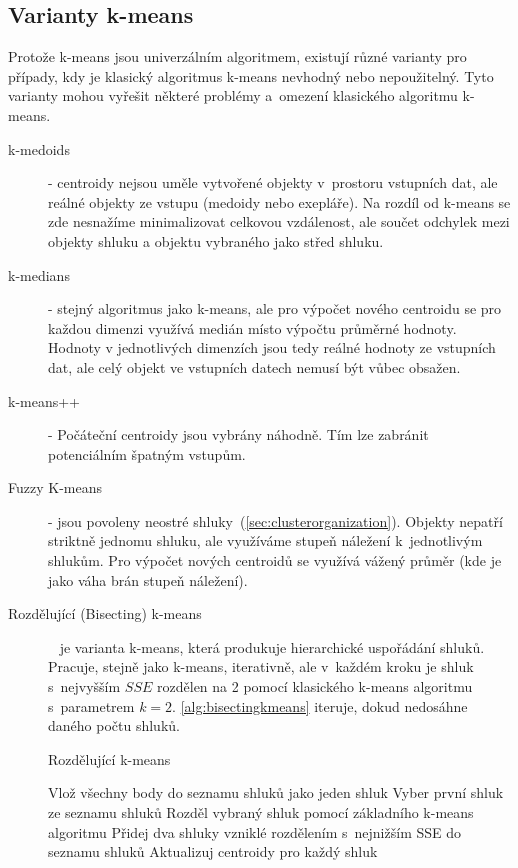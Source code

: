 \subsection{Varianty k-means}
Protože k-means jsou univerzálním algoritmem, existují různé varianty pro případy, kdy je klasický algoritmus k-means nevhodný nebo nepoužitelný. Tyto varianty mohou vyřešit některé problémy a~omezení klasického algoritmu k-means.
\begin{description}
\item[k-medoids] - centroidy nejsou uměle vytvořené objekty v~prostoru vstupních dat, ale reálné objekty ze vstupu (medoidy nebo exepláře). Na rozdíl od k-means se zde nesnažíme minimalizovat celkovou vzdálenost, ale součet odchylek mezi objekty shluku a objektu vybraného jako střed shluku.
\item[k-medians] - stejný algoritmus jako k-means, ale pro výpočet nového centroidu se pro každou dimenzi využívá medián místo výpočtu průměrné hodnoty. Hodnoty v jednotlivých dimenzích jsou tedy reálné hodnoty ze vstupních dat, ale celý objekt ve vstupních datech nemusí být vůbec obsažen.
\item[k-means++] - Počáteční centroidy jsou vybrány náhodně. Tím lze zabránit potenciálním špatným vstupům.
\item[Fuzzy K-means] - jsou povoleny neostré shluky~(\autoref{sec:clusterorganization}). Objekty nepatří striktně jednomu shluku, ale využíváme stupeň náležení k~jednotlivým shlukům. Pro výpočet nových centroidů se využívá vážený průměr (kde je jako váha brán stupeň náležení).
\item[Rozdělující (Bisecting) k-means]~\cite{Tan05} je varianta k-means, která produkuje hierarchické uspořádání shluků. Pracuje, stejně jako k-means, iterativně, ale v~každém kroku je shluk s~nejvyšším $SSE$ rozdělen na 2 pomocí klasického k-means algoritmu s~parametrem $k=2$. \autoref{alg:bisectingkmeans} iteruje, dokud nedosáhne daného počtu shluků.
\begin{algorithm}
\caption{Rozdělující k-means}\label{alg:bisectingkmeans}
\begin{algorithmic}[1]
\State Vlož všechny body do seznamu shluků jako jeden shluk
\Repeat
\State Vyber první shluk ze seznamu shluků
\State Rozděl vybraný shluk pomocí základního k-means algoritmu
\EndFor
\State Přidej dva shluky vzniklé rozdělením s~nejnižším SSE do seznamu shluků
\State Aktualizuj centroidy pro každý shluk
\end{algorithmic}
\end{algorithm}

\end{description}

